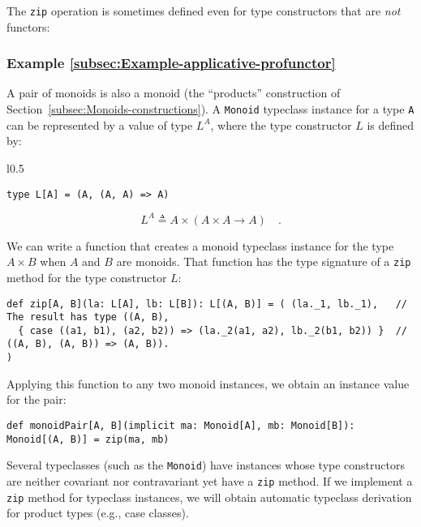 The \lstinline!zip! operation is sometimes defined even for type
constructors that are \emph{not} functors:

\subsubsection{Example \label{subsec:Example-applicative-profunctor}\ref{subsec:Example-applicative-profunctor}}

A pair of monoids is also a monoid (the \textsf{``}products\textsf{''} construction
of Section~\ref{subsec:Monoids-constructions}). A \lstinline!Monoid!
typeclass instance for a type \lstinline!A! can be represented by
a value of type $L^{A}$, where the type constructor $L$ is defined
by:

\begin{wrapfigure}{l}{0.5\columnwidth}%
\vspace{-0.85\baselineskip}
\begin{lstlisting}
type L[A] = (A, (A, A) => A)
\end{lstlisting}

\vspace{-0.25\baselineskip}
\end{wrapfigure}%

\noindent \vspace{-0.5\baselineskip}
\[
L^{A}\triangleq A\times\left(A\times A\rightarrow A\right)\quad.
\]

\noindent We can write a function that creates a monoid typeclass
instance for the type $A\times B$ when $A$ and $B$ are monoids.
That function has the type signature of a \lstinline!zip! method
for the type constructor $L$:
\begin{lstlisting}
def zip[A, B](la: L[A], lb: L[B]): L[(A, B)] = ( (la._1, lb._1),   // The result has type ((A, B),
  { case ((a1, b1), (a2, b2)) => (la._2(a1, a2), lb._2(b1, b2)) }  // ((A, B), (A, B)) => (A, B)).
)
\end{lstlisting}
Applying this function to any two monoid instances, we obtain an instance
value for the pair:
\begin{lstlisting}
def monoidPair[A, B](implicit ma: Monoid[A], mb: Monoid[B]): Monoid[(A, B)] = zip(ma, mb)
\end{lstlisting}

Several typeclasses (such as the \lstinline!Monoid!) have instances
whose type constructors are neither covariant nor contravariant yet
have a \lstinline!zip! method. If we implement a \lstinline!zip!
method for typeclass instances, we will obtain automatic typeclass
derivation for product types (e.g., case classes).

